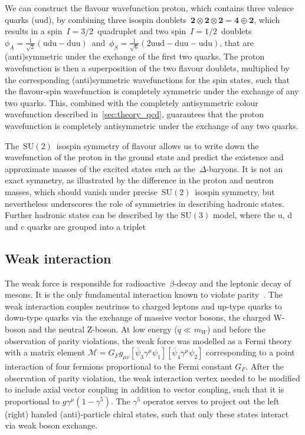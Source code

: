 We can construct the flavour wavefunction proton, which contains three valence quarks (uud), by combining three isospin doublets~$\mathbf{2} \otimes \mathbf{2} \otimes \mathbf{2} = \mathbf{4} \oplus \mathbf{2}$, which results in a spin~$I=3/2$~quadruplet and two spin~$I=1/2$~doublets~$\phi_A=\frac{1}{\sqrt{2}}(\mathrm{udu} - \mathrm{duu})$~and~$\phi_S = \frac{1}{\sqrt{6}}(2 \mathrm{uud} - \mathrm{duu} - \mathrm{udu})$, that are (anti)symmetric under the exchange of the first two quarks. The proton wavefunction is then a superposition of the two flavour doublets, multiplied by the corresponding (anti)symmetric wavefunctions for the spin states, such that the flavour-spin wavefunction is completely symmetric under the exchange of any two quarks. This, combined with the completely antisymmetric colour wavefunction described in~\cref{sec:theory_qcd}, guarantees that the proton wavefunction is completely antisymmetric under the exchange of any two quarks.

The~$\mathrm{SU}(2)$~isospin symmetry of flavour allows us to write down the wavefunction of the proton in the ground state and predict the existence and approximate masses of the excited states such as the~$\Delta$-baryons. It is not an exact symmetry, as illustrated by the difference in the proton and neutron masses, which should vanish under precise~$\mathrm{SU}(2)$~isospin symmetry, but nevertheless underscores the role of symmetries in describing hadronic states. Further hadronic states can be described by the $\mathrm{SU}(3)$ model, where the u, d and c quarks are grouped into a triplet

\subsection{Weak interaction}
The weak force is responsible for radioactive~$\beta$-decay and the leptonic decay of mesons. It is the only fundamental interaction known to violate parity~\cite{Wu:1957my}. The weak interaction couples neutrinos to charged leptons and up-type quarks to down-type quarks via the exchange of massive vector bosons, the charged W-boson and the neutral Z-boson. At low energy ($q \ll m_W$) and before the observation of parity violations, the weak force was modelled as a Fermi theory with a matrix element $\mathcal{M} = G_F g_{\mu\nu} [\bar{\psi}_3 \gamma^\mu \psi_1][\bar{\psi}_4 \gamma^\mu \psi_2]$ corresponding to a point interaction of four fermions proportional to the Fermi constant $G_F$. After the observation of parity violation, the weak interaction vertex needed to be modified to include axial vector coupling in addition to vector coupling, such that it is proportional to $g \gamma^\mu(1 - \gamma^5)$. The $\gamma^5$ operator serves to project out the left (right) handed (anti)-particle chiral states, such that only these states interact via weak boson exchange.

